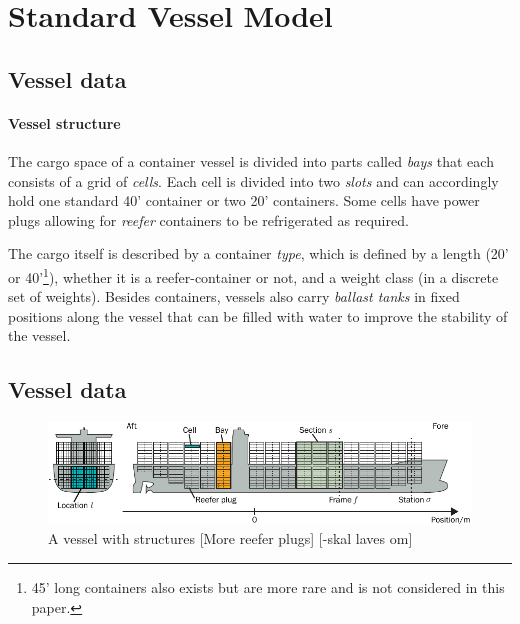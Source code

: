 %

%
\section{Standard Vessel Model}


\subsection*{Vessel data}
\paragraph{Vessel structure}
The cargo space of a container vessel is divided into parts called \textit{bays} that each consists of a grid of \emph{cells}. Each cell is divided into two \emph{slots} and can accordingly hold one standard 40' container or two 20' containers. Some cells have power plugs allowing for \emph{reefer} containers to be refrigerated as required. 

The cargo itself is described by a container \emph{type}, which is defined by a length (20' or 40'\footnote{45' long containers also exists but are more rare and is not considered in this paper.}), whether it is a reefer-container or not, and a weight class (in a discrete set of weights). 
Besides containers, vessels also carry \emph{ballast tanks} in fixed positions along the vessel that can be filled with water to improve the stability of the vessel.


\subsection*{Vessel data}
\begin{figure}
	\centering
		\includegraphics{figures/vessel.pdf}
	\caption{A vessel with structures [More reefer plugs] [-skal laves om]}
	\label{fig:vessel}
\end{figure}

